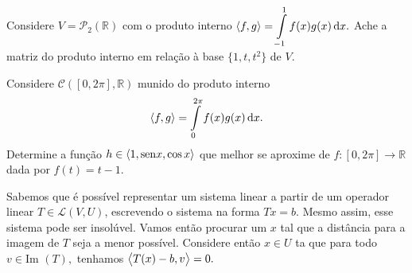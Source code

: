 \documentclass[11pt,a4paper]{article}
\begin{document}
\begin{exercicio}
Considere $V = \mathcal{P}_2(\mathbb{R})$ com o produto interno $\prin{f,g} = \displaystyle\int\limits_{-1}^1 f(x) g(x) \dif x.$ Ache a matriz do produto interno em relação à base $\{1, t, t^2 \}$ de $V.$
\end{exercicio}
 Considere $\mathcal{C}([0, 2 \pi], \mathbb{R})$ munido do produto interno
\[
\prin{f,g} = \displaystyle\int\limits_{0}^{2 \pi} f(x)g(x) \dif x.
\]
Determine a função $h \in \left\langle 1, {\rm sen} x, \cos x \right\rangle$ que melhor se aproxime de $f \colon [0, 2 \pi] \to \mathbb{R} $ dada por $f(t) = t - 1.$
\solucao{}

 Sabemos que é possível representar um sistema linear a partir de um operador linear $T \in \mathcal{L}(V,U)$, escrevendo o sistema na forma $Tx = b.$ Mesmo assim, esse sistema pode ser insolúvel. Vamos então procurar um $x$ tal que a distância para a imagem de $T$ seja a menor possível. Considere então $x \in U$ ta que para todo $v \in \mbox{Im }(T),$ tenhamos $\left\langle T(x)-b,v \right\rangle = 0.$
\end{document}
